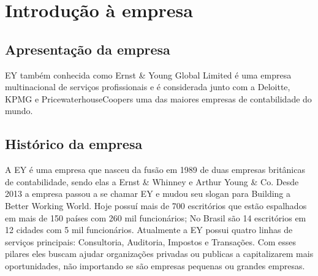 
\chapter[Introdução]{Introdução à empresa}

\section{Apresentação da empresa}

EY também conhecida como Ernst & Young Global Limited é uma empresa multinacional de serviços profissionais e é considerada junto com a Deloitte, KPMG e PricewaterhouseCoopers uma das maiores empresas de contabilidade do mundo. 

\section{Histórico da empresa}

A EY é uma empresa que nasceu da fusão em 1989 de duas empresas britânicas de contabilidade, sendo elas a Ernst & Whinney e Arthur Young & Co. Desde 2013 a empresa passou a se chamar EY e mudou seu slogan para Building a Better Working World. Hoje possuí mais de 700 escritórios que estão espalhados em mais de 150 países com 260 mil funcionários; No Brasil são 14 escritórios em 12 cidades com 5 mil funcionários. 
Atualmente a EY possui quatro linhas de serviços principais: Consultoria, Auditoria, Impostos e Transações. Com esses pilares eles buscam ajudar organizações privadas ou publicas a capitalizarem mais oportunidades, não importando se são empresas pequenas ou grandes empresas. 

